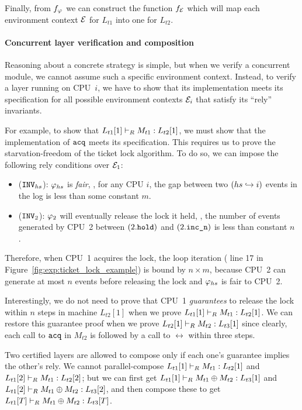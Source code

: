 Finally, from $f_{\varphi_{}}$ we can construct the function
$f_{\mathcal{E}}$ which will map each environment context $\mathcal{E}$ for
$L_{t1}$ into one for $L_{t2}$.

\paragraph{Concurrent layer verification and composition}
Reasoning about a concrete strategy is simple, but when we verify
a concurrent module, we cannot assume such a specific environment context.
Instead, to verify
a layer running on CPU~$i$, we have to show that its implementation
meets its specification for all possible environment contexts
$\mathcal{E}_i$ that satisfy its ``rely'' invariants.

For example, to show that $L_{t1}[1] \vdash_{R} M_{t1} : L_{t2}[1]$, we must
show that the implementation of ${\texttt{acq}}$ meets its specification.
This requires us to prove the starvation-freedom of the ticket
lock algorithm. To do so, we can impose the following rely conditions
over $\mathcal{E}_1$:
\begin{itemize} \itemsep 0pt
\item (${\texttt{INV}}_{hs}$):  $\varphi_{hs}$ is \emph{fair}, \ie,
  for any CPU $i$, the gap between two $(hs \hookrightarrow i)$ events
  in the log is less than some constant $m$.
\item (${\texttt{INV}}_{2}$):  $\varphi_{2}$ will eventually release the
  lock it held, \ie, the number of events generated by CPU~2
  between $(2.{\texttt{hold}})$ and $(2.{\texttt{inc\_n}})$   is less
  than constant $n$ .
\end{itemize}
Therefore, when CPU~1 acquires the lock, the loop iteration (\cf
line 17 in Figure~\ref{fig:exp:ticket_lock_example}) is bound by
$n \times m$, because CPU~2 can generate at most $n$ events before
releasing the lock and $\varphi_{hs}$ is fair to CPU~2.

Interestingly, we do not need
to prove that CPU~1 \emph{guarantees} to release the lock within $n$
steps in machine $L_{t2}[1]$
when we prove $L_{t1}[1] \vdash_{R} M_{t1} : L_{t2}[1]$.  We can restore
this guarantee proof when we prove $L_{t2}[1] \vdash_{R} M_{t2} : L_{t3}[1]$
since clearly, each call to ${\texttt{acq}}$ in $M_{t2}$ is followed by a call to
$\rel$ within three steps.

Two certified layers are allowed to compose only if each one's guarantee
implies the other's rely. We cannot parallel-compose
$L_{t1}[1] \vdash_{R} M_{t1} : L_{t2}[1]$ and 
$L_{t1}[2] \vdash_{R} M_{t1} : L_{t2}[2]$;
but we can first get $L_{t1}[1] \vdash_{R} M_{t1}\oplus{}M_{t2} : L_{t3}[1]$ and
$L_{t1}[2] \vdash_{R} M_{t1}\oplus{}M_{t2} : L_{t3}[2]$, and then compose these to
get $L_{t1}[T] \vdash_{R} M_{t1}\oplus{}M_{t2} : L_{t3}[T]$.

